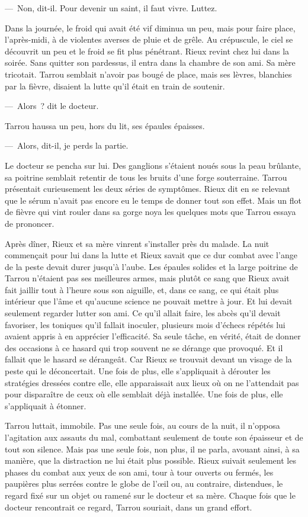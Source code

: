\documentclass[french,twoside]{book} %
\begin{document}
— Non, dit-il. Pour devenir un saint, il faut vivre. Luttez.\par
Dans la journée, le froid qui avait été vif diminua un peu, mais pour faire place, l’après-midi, à de violentes averses de pluie et de grêle. Au crépuscule, le ciel se découvrit un peu et le froid se fit plus pénétrant. Rieux revint chez lui dans la soirée. Sans quitter son pardessus, il entra dans la chambre de son ami. Sa mère tricotait. Tarrou semblait n’avoir pas bougé de place, mais ses lèvres, blanchies par la fièvre, disaient la lutte qu’il était en train de soutenir.\par
— Alors ? dit le docteur.\par
Tarrou haussa un peu, hors du lit, ses épaules épaisses.\par
— Alors, dit-il, je perds la partie.\par
Le docteur se pencha sur lui. Des ganglions s’étaient noués sous la peau brûlante, sa poitrine semblait retentir de tous les bruits d’une forge souterraine. Tarrou présentait curieusement les deux séries de symptômes. Rieux dit en se relevant que le sérum n’avait pas encore eu le temps de donner tout son effet. Mais un flot de fièvre qui vint rouler dans sa gorge noya les quelques mots que Tarrou essaya de prononcer.\par
Après dîner, Rieux et sa mère vinrent s’installer près du malade. La nuit commençait pour lui dans la lutte et Rieux savait que ce dur combat avec l’ange de la peste devait durer jusqu’à l’aube. Les épaules solides et la large poitrine de Tarrou n’étaient pas ses meilleures armes, mais plutôt ce sang que Rieux avait fait jaillir tout à l’heure sous son aiguille, et, dans ce sang, ce qui était plus intérieur que l’âme et qu’aucune science ne pouvait mettre à jour. Et lui devait seulement regarder lutter son ami. Ce qu’il allait faire, les abcès qu’il devait favoriser, les toniques qu’il fallait inoculer, plusieurs mois d’échecs répétés lui avaient appris à en apprécier l’efficacité. Sa seule tâche, en vérité, était de donner des occasions à ce hasard qui trop souvent ne se dérange que provoqué. Et il fallait que le hasard se dérangeât. Car Rieux se trouvait devant un visage de la peste qui le déconcertait. Une fois de plus, elle s’appliquait à dérouter les stratégies dressées contre elle, elle apparaissait aux lieux où on ne l’attendait pas pour disparaître de ceux où elle semblait déjà installée. Une fois de plus, elle s’appliquait à étonner.\par
Tarrou luttait, immobile. Pas une seule fois, au cours de la nuit, il n’opposa l’agitation aux assauts du mal, combattant seulement de toute son épaisseur et de tout son silence. Mais pas une seule fois, non plus, il ne parla, avouant ainsi, à sa manière, que la distraction ne lui était plus possible. Rieux suivait seulement les phases du combat aux yeux de son ami, tour à tour ouverts ou fermés, les paupières plus serrées contre le globe de l’œil ou, au contraire, distendues, le regard fixé sur un objet ou ramené sur le docteur et sa mère. Chaque fois que le docteur rencontrait ce regard, Tarrou souriait, dans un grand effort.\par
\end{document}
